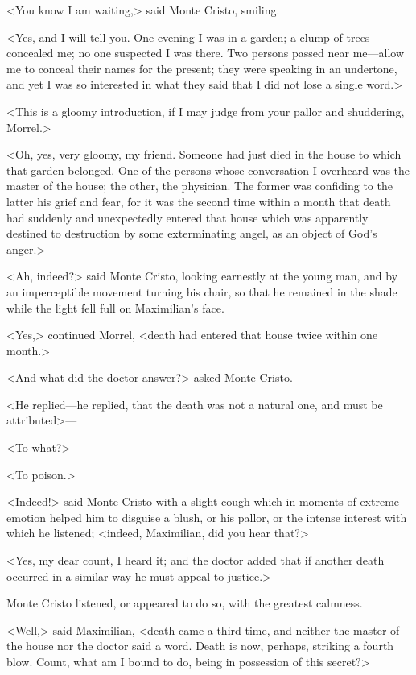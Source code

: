  <You know I am waiting,> said Monte Cristo, smiling. 

 <Yes, and I will tell you. One evening I was in a garden; a clump of trees concealed me; no one suspected I was there. Two persons passed near me—allow me to conceal their names for the present; they were speaking in an undertone, and yet I was so interested in what they said that I did not lose a single word.> 

 <This is a gloomy introduction, if I may judge from your pallor and shuddering, Morrel.> 

 <Oh, yes, very gloomy, my friend. Someone had just died in the house to which that garden belonged. One of the persons whose conversation I overheard was the master of the house; the other, the physician. The former was confiding to the latter his grief and fear, for it was the second time within a month that death had suddenly and unexpectedly entered that house which was apparently destined to destruction by some exterminating angel, as an object of God's anger.> 

 <Ah, indeed?> said Monte Cristo, looking earnestly at the young man, and by an imperceptible movement turning his chair, so that he remained in the shade while the light fell full on Maximilian's face. 

 <Yes,> continued Morrel, <death had entered that house twice within one month.> 

 <And what did the doctor answer?> asked Monte Cristo. 

 <He replied—he replied, that the death was not a natural one, and must be attributed>— 

 <To what?> 

 <To poison.> 

 <Indeed!> said Monte Cristo with a slight cough which in moments of extreme emotion helped him to disguise a blush, or his pallor, or the intense interest with which he listened; <indeed, Maximilian, did you hear that?> 

 <Yes, my dear count, I heard it; and the doctor added that if another death occurred in a similar way he must appeal to justice.> 

 Monte Cristo listened, or appeared to do so, with the greatest calmness. 

 <Well,> said Maximilian, <death came a third time, and neither the master of the house nor the doctor said a word. Death is now, perhaps, striking a fourth blow. Count, what am I bound to do, being in possession of this secret?> 

